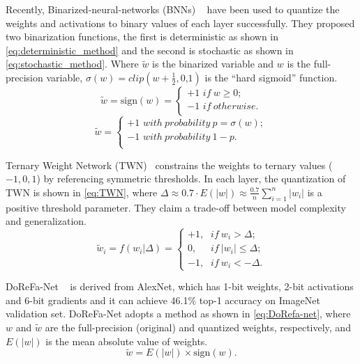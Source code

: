 \documentclass[twoside,twocolumn]{article}
\begin{document}
Recently, Binarized-neural-networks (BNNs) ~\cite{b16} have been used to quantize the weights and activations to binary values of each layer successfully. They proposed two binarization functions, the first is deterministic as shown in \eqref{eq:deterministic_method} and the second is stochastic as shown in \eqref{eq:stochastic_method}. Where $\tilde{w}$ is the binarized variable and $w$ is the full-precision variable, $\sigma( w )=clip( w+\frac{1}{2},\text{0,1})$ is the ``hard sigmoid'' function.
\begin{equation}\label{eq:deterministic_method}
\tilde{w}=\text{sign}(w) =\begin{cases}
	+\text{1\ }if\ w\geqslant \text{0;}\\
	-\text{1\ }if\ otherwise.\\
\end{cases}
\end{equation}
\begin{equation}\label{eq:stochastic_method}
\tilde{w}=\begin{cases}
	+\text{1\ }with\ probability\ p=\sigma(w) ;\\
	-\text{1\ }with\ probability\ 1-p.\\
\end{cases}
\end{equation}

Ternary Weight Network (TWN)~\cite{b36} constrains the weights to ternary values ($-1,0,1$) by referencing symmetric thresholds. In each layer, the quantization of TWN is shown in \eqref{eq:TWN}, where $\varDelta \approx 0.7\cdot E(|w|)\approx \frac{0.7}{n}\sum_{i=1}^{n}|w_i|$ is a positive threshold parameter. They claim a trade-off between model complexity and generalization.
\begin{equation}\label{eq:TWN}
\tilde{w}_i=f(w_i|\Delta) =\begin{cases}
	+\text{1,} & if\  w_i>\Delta ;\\
	\text{0,} & if\ |w_i|\leqslant \Delta ;\\
	-\text{1,} & if\ w_i<-\Delta .
\end{cases}
\end{equation}

DoReFa-Net ~\cite{b37} is derived from AlexNet, which has 1-bit weights, 2-bit activations and 6-bit gradients and it can achieve 46.1\% top-1 accuracy on ImageNet validation set. DoReFa-Net adopts a method as shown in \eqref{eq:DoRefa-net}, where $w$ and $\tilde{w}$ are the full-precision (original) and quantized weights, respectively, and $E(|w|)$ is the mean absolute value of weights.
 \begin{equation}\label{eq:DoRefa-net}
 \tilde{w}=E(|w|) \times \text{sign}(w).
 \end{equation}
\end{document}
